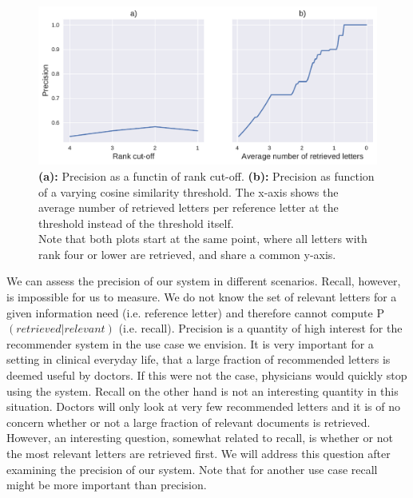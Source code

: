\begin{figure}
	\includegraphics[width=\linewidth]{figures/precision_rank_sim}
	\caption{\textbf{(a):} Precision as a functin of rank cut-off. \textbf{(b):} Precision as function of a varying cosine similarity threshold. The x-axis shows the average number of retrieved letters per reference letter at the threshold instead of the threshold itself.\\
	Note that both plots start at the same point, where all letters with rank four or lower are retrieved, and share a common y-axis.}
	\label{fig:precision}
\end{figure}

We can assess the precision of our system in different scenarios. Recall, however, is impossible for us to measure. We do not know the set of relevant letters for a given information need (i.e. reference letter) and therefore cannot compute P$(retrieved|relevant)$ (i.e. recall). Precision is a quantity of high interest for the recommender system in the use case we envision. It is very important for a setting in clinical everyday life, that a large fraction of recommended letters is deemed useful by doctors. If this were not the case, physicians would quickly stop using the system. Recall on the other hand is not an interesting quantity in this situation. Doctors will only look at very few recommended letters and it is of no concern whether or not a large fraction of relevant documents is retrieved. However, an interesting question, somewhat related to recall, is whether or not the most relevant letters are retrieved first. We will address this question after examining the precision of our system. Note that for another use case recall might be more important than precision. 

